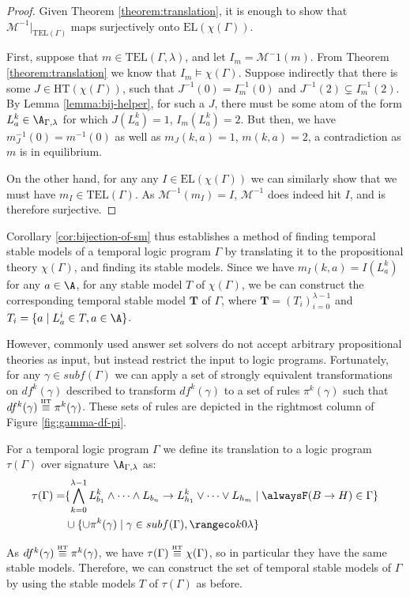 \begin{proof}
  Given Theorem \ref{theorem:translation}, it is enough to show that
  $\mathcal{M}^{-1}\vert_{\text{TEL}(\Gamma)}$ maps surjectively onto
  $\text{EL}(\chi(\Gamma))$.

  First, suppose that $m \in \text{TEL}(\Gamma,\lambda)$, and let
  $I_m = \mathcal{M}^-1(m)$. From Theorem \ref{theorem:translation} we
  know that $I_m \models \chi(\Gamma)$. Suppose indirectly that there
  is some $J \in \text{HT}(\chi(\Gamma))$, such that
  $J^{-1}(0) = I_m^{-1}(0)$ and $J^{-1}(2) \subsetneq I_m^{-1}(2)$. By
  Lemma \ref{lemma:bij-helper}, for such a $J$, there must be some
  atom of the form $L_{a}^k \in \A_{\Gamma,\lambda}$ for which
  $J(L_{a}^k)=1$, $I_m(L_a^k)=2$. But then, we have
  $m_J^{-1}(0) = m^{-1}(0)$ as well as $m_J(k,a) = 1$, $m(k,a) = 2$, a
  contradiction as $m$ is in equilibrium.

  On the other hand, for any any $I \in \text{EL}(\chi(\Gamma))$ we
  can similarly show that we must have $m_I \in \text{TEL}(\Gamma)$.
  As $\mathcal{M}^{-1}(m_I) = I$, $\mathcal{M}^{-1}$ does indeed hit
  $I$, and is therefore surjective.
\end{proof}

Corollary \ref{cor:bijection-of-sm} thus establishes a method of
finding temporal stable models of a temporal logic program $\Gamma$ by
translating it to the propositional theory $\chi(\Gamma)$, and finding
its stable models. Since we have $m_I(k,a)=I(L_a^k)$ for any
$a\in \A$, for any stable model $T$ of $\chi(\Gamma)$, we be can
construct the corresponding temporal stable model $\bm{T}$ of
$\Gamma$, where $\bm{T} = (T_i)_{i=0}^{\lambda - 1}$ and
$T_i = \{ a \mid L^i_{a} \in T, a \in \A \}$.

However, commonly used answer set solvers do not accept arbitrary
propositional theories as input, but instead restrict the input to
logic programs. Fortunately, for any $\gamma \in subf(\Gamma)$ we can
apply a set of strongly equivalent transformations on $df^k(\gamma)$
described \cite{capeva05a} to transform $df^k(\gamma)$ to a set of
rules $\pi^k(\gamma)$ such that $df^k(\gamma) \stackrel{\normalfont\mbox{\tiny HT}}{\equiv}
\pi^k(\gamma)$. These sets of rules are depicted in the rightmost
column of Figure \ref{fig:gamma-df-pi}.

For a temporal logic program $\Gamma$ we define its translation to a logic
program $\tau(\Gamma)$ over signature $\A_{\Gamma,\lambda}$ as:
\begin{align*}
  \tau(\Gamma)  = &\{ \bigwedge_{k=0}^{\lambda-1} L_{b_1}^k \land \dots \land L_{b_n}
                    \rightarrow L_{h_1}^k \lor \dots \lor L_{h_m} \mid \tempruleshort \in \Gamma \} \\
                  & \cup \{ \cup \pi^k(\gamma) \mid \gamma \in subf(\Gamma), \kinlambda \}
\end{align*}

As $df^k(\gamma) \stackrel{\normalfont\mbox{\tiny HT}}{\equiv} \pi^k(\gamma)$, we have
$\tau(\Gamma) \stackrel{\normalfont\mbox{\tiny HT}}{\equiv} \chi(\Gamma)$, so in particular they have the
same stable models. Therefore, we can construct the set of temporal
stable models of $\Gamma$ by using the stable models $T$ of
$\tau(\Gamma)$ as before.
